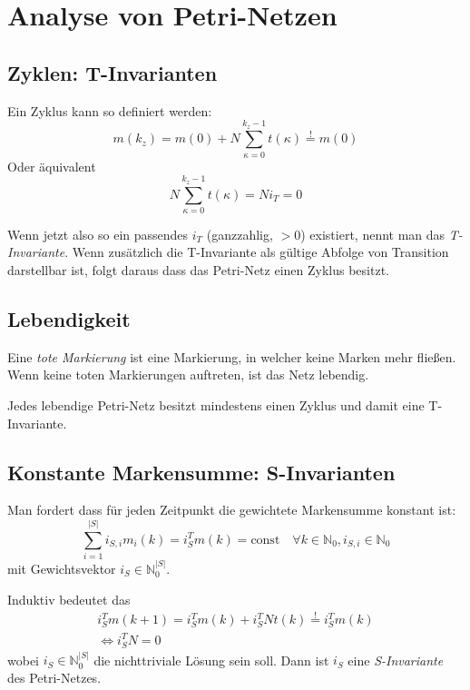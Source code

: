 \section{Analyse von Petri-Netzen}
\subsection{Zyklen: T-Invarianten}
Ein Zyklus kann so definiert werden:
\begin{equation}
    m(k_z) = m(0) + N \sum_{\kappa=0}^{k_z-1} t(\kappa) \overset{!}{=} m(0)
\end{equation}
Oder äquivalent
\begin{equation}
    N \sum_{\kappa=0}^{k_z-1} t(\kappa) = \boxed{N i_T = 0}
\end{equation}

Wenn jetzt also so ein passendes $i_T$ (ganzzahlig, $>0$) existiert,
nennt man das \emph{T-Invariante}.
Wenn zusätzlich die T-Invariante als gültige Abfolge von Transition darstellbar ist,
folgt daraus dass das Petri-Netz einen Zyklus besitzt.

\subsection{Lebendigkeit}
Eine \emph{tote Markierung} ist eine Markierung, in welcher keine Marken mehr fließen.
Wenn keine toten Markierungen auftreten, ist das Netz lebendig.

Jedes lebendige Petri-Netz besitzt mindestens einen Zyklus und damit eine T-Invariante.

\subsection{Konstante Markensumme: S-Invarianten}
Man fordert dass für jeden Zeitpunkt die gewichtete Markensumme konstant ist:
\begin{equation}
    \sum_{i=1}^{|S|} i_{S,i} m_i(k) = i_S^T m(k) = \text{const} \quad
    \forall k\in \mathbb{N}_0, i_{S,i}\in \mathbb{N}_0
\end{equation}
mit Gewichtsvektor $i_S \in \mathbb{N}_0^{|S|}$.

Induktiv bedeutet das
\begin{equation}
\begin{gathered}
    i_S^Tm(k+1) = i_S^Tm(k) + i_S^TNt(k) \stackrel{!}{=} i_S^Tm(k) \\
    \iff \boxed{i_S^TN = 0}
\end{gathered}
\end{equation}
wobei $i_S \in \mathbb{N}_0^{|S|}$ die nichttriviale Lösung sein soll.
Dann ist $i_S$ eine \emph{S-Invariante} des Petri-Netzes.

